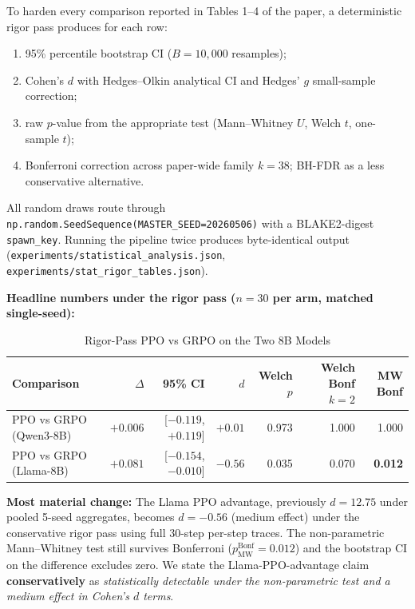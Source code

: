 \documentclass[12pt,a4paper]{report}
\theoremstyle{definition}
\begin{document}
To harden every comparison reported in Tables 1--4 of the paper, a deterministic rigor pass produces
for each row:
\begin{enumerate}[nosep]
\item 95\% percentile bootstrap CI ($B = 10{,}000$ resamples);
\item Cohen's $d$ with Hedges--Olkin analytical CI and Hedges' $g$ small-sample correction;
\item raw $p$-value from the appropriate test (Mann--Whitney $U$, Welch $t$, one-sample $t$);
\item Bonferroni correction across paper-wide family $k = 38$; BH-FDR as a less conservative alternative.
\end{enumerate}

All random draws route through \texttt{np.random.SeedSequence(MASTER\_SEED=20260506)} with a
BLAKE2-digest \texttt{spawn\_key}. Running the pipeline twice produces byte-identical output
(\texttt{experiments/statistical\_analysis.json}, \texttt{experiments/stat\_rigor\_tables.json}).

\textbf{Headline numbers under the rigor pass ($n = 30$ per arm, matched single-seed):}

\begin{table}[htbp]
\centering
\caption{Rigor-Pass PPO vs GRPO on the Two 8B Models}
\label{tab:rigor}
\footnotesize
\begin{tabular}{lrrrrrr}
\toprule
\textbf{Comparison} & \textbf{$\Delta$} & \textbf{95\% CI} & \textbf{$d$} & \textbf{Welch $p$} & \textbf{Welch Bonf $k{=}2$} & \textbf{MW Bonf} \\
\midrule
PPO vs GRPO (Qwen3-8B)  & $+0.006$ & [$-0.119$, $+0.119$] & $+0.01$ & 0.973 & 1.000 & 1.000 \\
PPO vs GRPO (Llama-8B)  & $+0.081$ & [$-0.154$, $-0.010$] & $-0.56$ & 0.035 & 0.070 & \textbf{0.012} \\
\bottomrule
\end{tabular}
\end{table}

\textbf{Most material change:} The Llama PPO advantage, previously $d = 12.75$ under pooled 5-seed
aggregates, becomes $d = -0.56$ (medium effect) under the conservative rigor pass using full 30-step
per-step traces. The non-parametric Mann--Whitney test still survives Bonferroni
($p_{\text{MW}}^{\text{Bonf}} = 0.012$) and the bootstrap CI on the difference excludes zero. We state
the Llama-PPO-advantage claim \textbf{conservatively} as \emph{statistically detectable under the
non-parametric test and a medium effect in Cohen's $d$ terms}.
\end{document}
